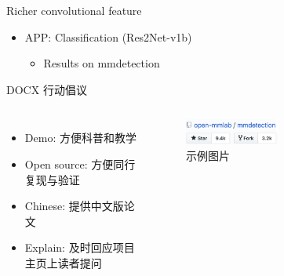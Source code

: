 \begin{frame}{Richer convolutional feature}
  \begin{itemize}
    \item APP: Classification (Res2Net-v1b)
      \begin{itemize}
        \item Results on mmdetection
      \end{itemize}
  \end{itemize}
  \vspace{0.5em}
  \centering
\end{frame}

\begin{frame}{\textcolor{midblue}{D}\textcolor{myred}{O}\textcolor{mygreen}{C}\textcolor{mypurple}{X} 行动倡议}
  \begin{columns}
    \begin{itemize}
      \item \textcolor{midblue}{D}emo: 方便科普和教学
      \item \textcolor{myred}{O}pen source: 方便同行复现与验证
      \item \textcolor{mygreen}{C}hinese: 提供中文版论文
      \item \textcolor{mypurple}{E}xplain: 及时回应项目主页上读者提问
    \end{itemize}
    \begin{figure}
      \centering
      \includegraphics[width=0.5\textwidth]{image/image1.png}
      \caption{示例图片}
    \end{figure}
  \end{columns}
\end{frame}

